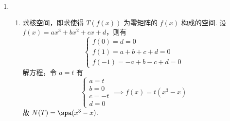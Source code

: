 \begin{enumerate}
    \item \begin{enumerate}
              \item \label{item:7:B:5:1}
                    求核空间，即求使得 $ T(f(x)) $ 为零矩阵的 $ f(x) $ 构成的空间. 设 $ f(x) = ax^3 + bx^2 + cx + d $，则有
                    \[ \begin{cases}
                            f(0) = d = 0             \\
                            f(1) = a + b + c + d = 0 \\
                            f(-1) = -a + b -c + d = 0
                        \end{cases} \]
                    解方程，令 $ a = t $ 有
                    \[ \begin{cases}
                            a = t  \\
                            b = 0  \\
                            c = -t \\
                            d = 0
                        \end{cases} \implies f(x) = t(x^3 - x) \]
                    故 $ N(T) = \spa(x^3 - x) $.


\end{enumerate}
\end{enumerate}
